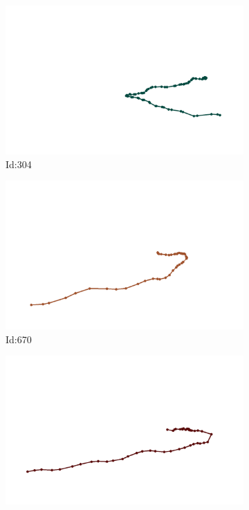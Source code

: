 \documentclass[12pt,twoside]{report}
\begin{document}
\begin{figure}
\centering
\begin{subfigure}[b]{0.20\textwidth}
\centering
\includegraphics[width=\textwidth]{../../trajectories/304.png}
\caption{Id:304}
\end{subfigure}
\begin{subfigure}[b]{0.20\textwidth}
\centering
\includegraphics[width=\textwidth]{../../trajectories/670.png}
\caption{Id:670}
\end{subfigure}
\begin{subfigure}[b]{0.20\textwidth}
\centering
\includegraphics[width=\textwidth]{../../trajectories/736.png}

\end{subfigure}
\end{figure}
\end{document}
